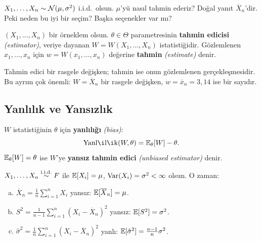 \begin{kesif}
$X_1,\ldots,X_n \sim \mathcal{N}(\mu,\sigma^2)$ i.i.d.\ olsun. $\mu$'yü nasıl tahmin ederiz? Doğal yanıt $\overline{X}_n$'dir. Peki neden bu iyi bir seçim? Başka seçenekler var mı?
\end{kesif}

\begin{tanim}\label{def:tahmin_edici}
$(X_1,\ldots,X_n)$ bir örneklem olsun. $\theta \in \Theta$ parametresinin \textbf{tahmin edicisi} \emph{(estimator)}, veriye dayanan $W = W(X_1,\ldots,X_n)$ istatistiğidir. Gözlemlenen $x_1,\ldots,x_n$ için $w = W(x_1,\ldots,x_n)$ değerine \textbf{tahmin} \emph{(estimate)} denir.
\end{tanim}

\begin{tanimgerekce}
Tahmin edici bir rasgele değişken; tahmin ise onun gözlemlenen gerçekleşmesidir. Bu ayrım çok önemli: $W = \overline{X}_n$ bir rasgele değişken, $w = \bar{x}_n = 3{,}14$ ise bir sayıdır.
\end{tanimgerekce}

\subsection{Yanlılık ve Yansızlık}

\begin{tanim}[Yanlılık]\label{def:yanlilik}
$W$ istatistiğinin $\theta$ için \textbf{yanlılığı} \emph{(bias)}:
\[
  \mathrm{Yanlılık}(W,\theta) = \Beklenti_\theta[W] - \theta.
\]
$\mathbb{E}_\theta[W] = \theta$ ise $W$'ye \textbf{yansız tahmin edici} \emph{(unbiased estimator)} denir.
\end{tanim}

\begin{teorem}\label{thm:orn_istatistik}
$X_1,\ldots,X_n \overset{\text{i.i.d.}}{\sim} F$ ile $\mathbb{E}[X_i]=\mu$, $\operatorname{Var}(X_i)=\sigma^2 < \infty$ olsun. O zaman:
\begin{enumerate}[(a)]
  \item $\overline{X}_n = \frac{1}{n}\sum_{i=1}^n X_i$ yansız: $\mathbb{E}[\overline{X}_n] = \mu$.
  \item $S^2 = \frac{1}{n-1}\sum_{i=1}^n (X_i - \overline{X}_n)^2$ yansız: $\mathbb{E}[S^2] = \sigma^2$.
  \item $\hat{\sigma}^2 = \frac{1}{n}\sum_{i=1}^n(X_i-\overline{X}_n)^2$ yanlı: $\mathbb{E}[\hat{\sigma}^2] = \frac{n-1}{n}\sigma^2$.
\end{enumerate}
\end{teorem}

